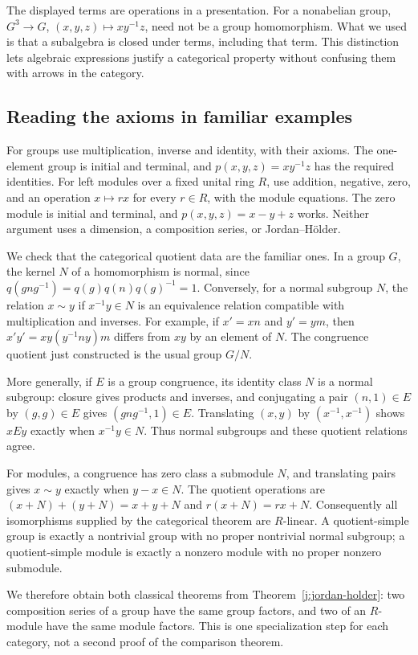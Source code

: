 \documentclass[11pt]{article}
\theoremstyle{definition}
\theoremstyle{remark}\newtheorem{remark}[theorem]{Remark}
\begin{document}
The displayed terms are operations in a presentation. For a nonabelian group,
$G^3\to G$, $(x,y,z)\mapsto xy^{-1}z$, need not be a group homomorphism.
What we used is that a subalgebra is closed under terms, including that term.
This distinction lets algebraic expressions justify a categorical property
without confusing them with arrows in the category.

\subsection{Reading the axioms in familiar examples}\label{e:examples}

For groups use multiplication, inverse and identity, with their axioms.
The one-element group is initial and terminal, and
$p(x,y,z)=xy^{-1}z$ has the required identities. For left modules over a fixed
unital ring $R$, use addition, negative, zero, and an operation $x\mapsto rx$
for every $r\in R$, with the module equations. The zero module is initial
and terminal, and $p(x,y,z)=x-y+z$ works. Neither argument uses a dimension,
a composition series, or Jordan--H\"older.

We check that the categorical quotient data are the familiar ones. In a
group $G$, the kernel $N$ of a homomorphism is normal, since
$q(gng^{-1})=q(g)q(n)q(g)^{-1}=1$. Conversely, for a normal subgroup $N$,
the relation $x\sim y$ if $x^{-1}y\in N$ is an equivalence relation
compatible with multiplication and inverses. For example, if $x'=xn$ and
$y'=ym$, then $x'y'=xy(y^{-1}ny)m$ differs from $xy$ by an element of $N$.
The congruence quotient just constructed is the usual group $G/N$.

More generally, if $E$ is a group congruence, its identity class $N$ is a
normal subgroup: closure gives products and inverses, and conjugating a pair
$(n,1)\in E$ by $(g,g)\in E$ gives $(gng^{-1},1)\in E$. Translating
$(x,y)$ by $(x^{-1},x^{-1})$ shows $xEy$ exactly when $x^{-1}y\in N$.
Thus normal subgroups and these quotient relations agree.

For modules, a congruence has zero class a submodule $N$, and translating
pairs gives $x\sim y$ exactly when $y-x\in N$. The quotient operations are
$(x+N)+(y+N)=x+y+N$ and $r(x+N)=rx+N$. Consequently all isomorphisms supplied
by the categorical theorem are $R$-linear. A quotient-simple group is exactly
a nontrivial group with no proper nontrivial normal subgroup; a quotient-simple
module is exactly a nonzero module with no proper nonzero submodule.

We therefore obtain both classical theorems from Theorem~\ref{j:jordan-holder}:
two composition series of a group have the same group factors, and two of an
$R$-module have the same module factors. This is one specialization step for
each category, not a second proof of the comparison theorem.
\end{document}
